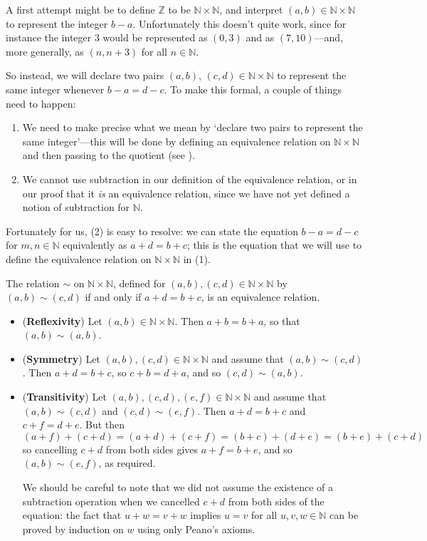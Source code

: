 A first attempt might be to define $\mathbb{Z}$ to be $\mathbb{N} \times \mathbb{N}$, and interpret $(a,b) \in \mathbb{N} \times \mathbb{N}$ to represent the integer $b-a$. Unfortunately this doesn't quite work, since for instance the integer $3$ would be represented as $(0,3)$ and as $(7,10)$---and, more generally, as $(n,n+3)$ for all $n \in \mathbb{N}$.

So instead, we will declare two pairs $(a,b)$, $(c,d) \in \mathbb{N} \times \mathbb{N}$ to represent the same integer whenever $b-a = d-c$. To make this formal, a couple of things need to happen:
\begin{enumerate}[(1)]
\item We need to make precise what we mean by `declare two pairs to represent the same integer'---this will be done by defining an equivalence relation on $\mathbb{N} \times \mathbb{N}$ and then passing to the quotient (see ).
\item We cannot use subtraction in our definition of the equivalence relation, or in our proof that it \textit{is} an equivalence relation, since we have not yet defined a notion of subtraction for $\mathbb{N}$.
\end{enumerate}

Fortunately for us, (2) is easy to resolve: we can state the equation $b-a = d-c$ for $m,n \in \mathbb{N}$ equivalently as $a+d = b+c$; this is the equation that we will use to define the equivalence relation on $\mathbb{N} \times \mathbb{N}$ in (1).

\begin{lemma}
\label{lemEquivalenceRelationToConstructZFromN}
The relation $\sim$ on $\mathbb{N} \times \mathbb{N}$, defined for $(a,b), (c,d) \in \mathbb{N} \times \mathbb{N}$ by $(a,b) \sim (c,d)$ if and only if $a+d=b+c$, is an equivalence relation.
\end{lemma}

\begin{cproof}
\fixlistskip%
\begin{itemize}
\item (\textbf{Reflexivity}) Let $(a,b) \in \mathbb{N} \times \mathbb{N}$. Then $a+b = b+a$, so that $(a,b) \sim (a,b)$.
\item (\textbf{Symmetry}) Let $(a,b), (c,d) \in \mathbb{N} \times \mathbb{N}$ and assume that $(a,b) \sim (c,d)$. Then $a+d=b+c$, so $c+b=d+a$, and so $(c,d) \sim (a,b)$.
\item (\textbf{Transitivity}) Let $(a,b), (c,d), (e,f) \in \mathbb{N} \times \mathbb{N}$ and assume that $(a,b) \sim (c,d)$ and $(c,d) \sim (e,f)$. Then $a+d=b+c$ and $c+f=d+e$. But then
\[ (a + f) + (c + d) = (a+d) + (c+f) = (b+c) + (d+e) = (b+e) + (c+d) \]
so cancelling $c+d$ from both sides gives $a+f = b+e$, and so $(a,b) \sim (e,f)$, as required.

We should be careful to note that we did not assume the existence of a subtraction operation when we cancelled $c+d$ from both sides of the equation: the fact that $u+w=v+w$ implies $u=v$ for all $u,v,w \in \mathbb{N}$ can be proved by induction on $w$ using only Peano's axioms.
\fixlistskip%
\end{itemize}
\end{cproof}


